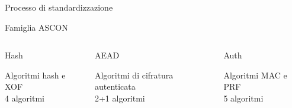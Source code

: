 
\begin{frame}{Processo di standardizzazione}

    
    \startchronology
    \stopchronology

\end{frame}


\begin{frame}{Famiglia ASCON}
    \begin{columns}

    \begin{column}{0.30\textwidth}

    \begin{block}{Hash}
        \begin{center}
            Algoritmi hash e XOF \\ 4 algoritmi
        \end{center}
    \end{block}

    \end{column}
    
    \begin{column}{0.40\textwidth}

    \begin{block}{AEAD}
        \begin{center}
            Algoritmi di cifratura autenticata \\ 2+1 algoritmi
        \end{center}
    \end{block}

    \end{column}

    \begin{column}{0.30\textwidth}

    \begin{block}{Auth}
        \begin{center}
            Algoritmi MAC e PRF \\ 5 algoritmi
        \end{center}
    \end{block}

    \end{column}

    \end{columns}
\end{frame}
